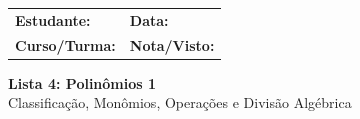 \documentclass[12pt,a4paper]{article}
\begin{document}
\begin{tcolorbox}[colback=bglight, colframe=primary, boxrule=1pt, arc=3pt]
  \sffamily\small
  \begin{tabular}{@{}p{} p{}@{}}
    \textbf{Estudante:} \hrulefill & \textbf{Data:} \hrulefill \\[0.25cm]
    \textbf{Curso/Turma:} \hrulefill & \textbf{Nota/Visto:} \hrulefill
  \end{tabular}
\end{tcolorbox}

\begin{center}
  {\LARGE\bfseries\color{primary} Lista 4: Polinômios 1} \\[0.1cm]
  {\small\sffamily\color{gray} Classificação, Monômios, Operações e Divisão Algébrica}
\end{center}

\vspace{0.1cm}
\end{document}
